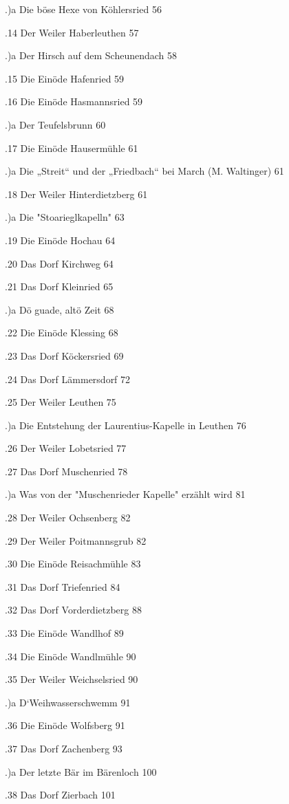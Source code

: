 .)a Die böse Hexe von Köhlersried   56

.14 Der Weiler Haberleuthen 57

.)a Der Hirsch auf dem Scheunendach 58

.15 Die Einöde Hafenried    59

.16 Die Einöde Hasmannsried 59

.)a Der Teufelsbrunn    60

.17 Die Einöde Hausermühle  61

.)a Die „Streit“ und der „Friedbach“ bei March (M. Waltinger)   61

.18 Der Weiler Hinterdietzberg  61

.)a Die "Stoarieglkapelln"  63

.19 Die Einöde Hochau   64

.20 Das Dorf Kirchweg   64

.21 Das Dorf Kleinried  65

.)a Dö guade, altö Zeit 68

.22 Die Einöde Klessing 68

.23 Das Dorf Köckersried    69

.24 Das Dorf Lämmersdorf    72

.25 Der Weiler Leuthen  75

.)a Die Entstehung der Laurentius-Kapelle in Leuthen    76

.26 Der Weiler Lobetsried   77

.27 Das Dorf Muschenried    78

.)a Was von der "Muschenrieder Kapelle" erzählt wird    81

.28 Der Weiler Ochsenberg   82

.29 Der Weiler Poitmannsgrub    82

.30 Die Einöde Reisachmühle 83

.31 Das Dorf Triefenried    84

.32 Das Dorf Vorderdietzberg    88

.33 Die Einöde Wandlhof 89

.34 Die Einöde Wandlmühle   90

.35 Der Weiler Weichselsried    90

.)a D`Weihwasserschwemm 91

.36 Die Einöde Wolfsberg    91

.37 Das Dorf Zachenberg 93

.)a Der letzte Bär im Bärenloch 100

.38 Das Dorf Zierbach   101

